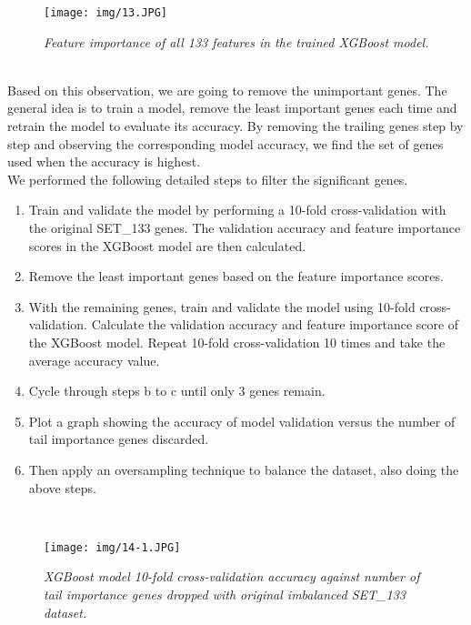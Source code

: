 \documentclass[12pt,a4paper]{report}
\begin{document}
\begin{figure}[h!]
\centering
\texttt{[image: img/13.JPG]}
\caption{\textit{Feature importance of all 133 features  in the trained XGBoost model.}}
\label{fig:133importance}
\end{figure}\\

Based on this observation, we are going to remove the unimportant genes. The general idea is to train a model, remove the least important genes each time and retrain the model to evaluate its accuracy. By removing the trailing genes step by step and observing the corresponding model accuracy, we find the set of genes used when the accuracy is highest.\\

We performed the following detailed steps to filter the significant genes.\\

\begin{enumerate}[\hspace{3em}a.]
\item Train and validate the model by performing a 10-fold cross-validation with the original SET\_133 genes. The validation accuracy and feature importance scores in the XGBoost model are then calculated.
\item Remove the least important genes based on the feature importance scores.
\item With the remaining genes, train and validate the model using 10-fold cross-validation. Calculate the validation accuracy and feature importance score of the XGBoost model. Repeat 10-fold cross-validation 10 times and take the average accuracy value.
\item Cycle through steps b to c until only 3 genes remain.
\item Plot a graph showing the accuracy of model validation versus the number of tail importance genes discarded.
\item Then apply an oversampling technique to balance the dataset, also doing the above steps.
\end{enumerate}\\



\begin{figure}[h!]
\centering
\texttt{[image: img/14-1.JPG]}
\caption{\textit{XGBoost model 10-fold cross-validation accuracy against number of tail importance genes dropped with original imbalanced SET\_133 dataset. }}
\label{fig:oridrop}
\end{figure}\\
\end{document}

